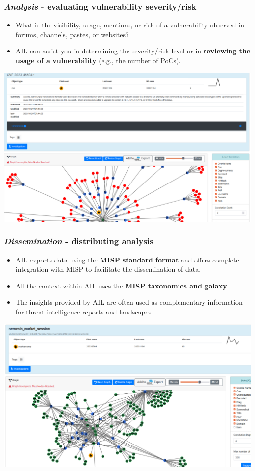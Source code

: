 \documentclass{beamer}
\begin{document}
\begin{frame}
    \frametitle{{\it Analysis} - evaluating vulnerability severity/risk}
    \begin{itemize}
         \item What is the visibility, usage, mentions, or risk of a vulnerability observed in forums, channels, pastes, or websites?
         \item AIL can assist you in determining the severity/risk level or in {\bf reviewing the usage of a vulnerability} (e.g., the number of PoCs).
    \end{itemize}
    \begin{center}
         \includegraphics[scale=0.15]{images/ail-CVE-example.png}
    \end{center}
\end{frame}

\begin{frame}
    \frametitle{{\it Dissemination} - distributing analysis}
\begin{itemize}
    \item AIL exports data using the {\bf MISP standard format} and offers complete integration with MISP to facilitate the dissemination of data.
    \item All the context within AIL uses the {\bf MISP taxonomies and galaxy}.
    \item The insights provided by AIL are often used as complementary information for threat intelligence reports and landscapes.
\end{itemize}
    \begin{center}
      \includegraphics[scale=0.15]{images/ail-cookie.png}
    \end{center}
\end{frame}
\end{document}
